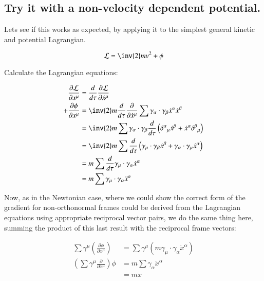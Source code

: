 \subsection{Try it with a non-velocity dependent potential. }

Lets see if this works as expected, by applying it to the simplest general
kinetic and potential Lagrangian.

\begin{equation}
\mathcal{L} = \inv{2} m v^2 + \phi
\end{equation}

Calculate the Lagrangian equations:

\begin{align*}
\frac{\partial \mathcal{L}}{\partial x^{\mu}} &= \frac{d}{d\tau} \frac{\partial \mathcal{L}}{\partial \xdot^{\mu}} \\
+ \frac{\partial \phi}{\partial x^{\mu}} 
&= \inv{2} m \frac{d}{d\tau} \frac{\partial}{\partial \xdot^{\mu}} \sum \gamma_{\alpha} \cdot \gamma_{\beta} \xdot^{\alpha} \xdot^{\beta} \\
&= \inv{2} m \sum \gamma_{\alpha} \cdot \gamma_{\beta} \frac{d}{d\tau} \left({\delta^{\alpha}}_{\mu} \xdot^{\beta} + \xdot^{\alpha} {\delta^{\beta}}_{\mu}\right) \\
&= \inv{2} m \sum \frac{d}{d\tau}
\left(\gamma_{\mu} \cdot \gamma_{\beta} \xdot^{\beta} + \gamma_{\alpha} \cdot \gamma_{\mu} \xdot^{\alpha} \right) \\
&= m \sum \frac{d}{d\tau} \gamma_{\mu} \cdot \gamma_{\alpha} \xdot^{\alpha} \\
&= m \sum \gamma_{\mu} \cdot \gamma_{\alpha} \ddot{x}^{\alpha} \\
\end{align*}

Now, as in the Newtonian case, where we could show the correct form of the gradient for non-orthonormal frames could be derived from the Lagrangian equations using appropriate reciprocal vector pairs, we do the same thing here, summing the product of this last result with the reciprocal frame vectors:

\begin{align*}
\sum \gamma^{\mu} \left(\frac{\partial \phi}{\partial x^{\mu}}\right) &= \sum \gamma^{\mu} \left(m \gamma_{\mu} \cdot \gamma_{\alpha} \ddot{x}^{\alpha}\right) \\
\left(\sum \gamma^{\mu} \frac{\partial}{\partial x^{\mu}}\right) \phi 
&= m \sum \gamma_{\alpha} \ddot{x}^{\alpha} \\
&= m \ddot{x}
\end{align*}

